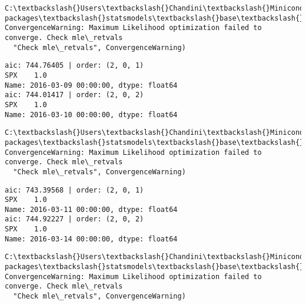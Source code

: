 \documentclass[11pt]{article}
\begin{document}
    \begin{Verbatim}[commandchars=\\\{\}]
C:\textbackslash{}Users\textbackslash{}Chandini\textbackslash{}Miniconda3\textbackslash{}envs\textbackslash{}auquan\textbackslash{}lib\textbackslash{}site-packages\textbackslash{}statsmodels\textbackslash{}base\textbackslash{}model.py:496: ConvergenceWarning: Maximum Likelihood optimization failed to converge. Check mle\_retvals
  "Check mle\_retvals", ConvergenceWarning)

    \end{Verbatim}

    \begin{Verbatim}[commandchars=\\\{\}]
aic: 744.76405 | order: (2, 0, 1)
SPX    1.0
Name: 2016-03-09 00:00:00, dtype: float64
aic: 744.01417 | order: (2, 0, 2)
SPX    1.0
Name: 2016-03-10 00:00:00, dtype: float64

    \end{Verbatim}

    \begin{Verbatim}[commandchars=\\\{\}]
C:\textbackslash{}Users\textbackslash{}Chandini\textbackslash{}Miniconda3\textbackslash{}envs\textbackslash{}auquan\textbackslash{}lib\textbackslash{}site-packages\textbackslash{}statsmodels\textbackslash{}base\textbackslash{}model.py:496: ConvergenceWarning: Maximum Likelihood optimization failed to converge. Check mle\_retvals
  "Check mle\_retvals", ConvergenceWarning)

    \end{Verbatim}

    \begin{Verbatim}[commandchars=\\\{\}]
aic: 743.39568 | order: (2, 0, 1)
SPX    1.0
Name: 2016-03-11 00:00:00, dtype: float64
aic: 744.92227 | order: (2, 0, 2)
SPX    1.0
Name: 2016-03-14 00:00:00, dtype: float64

    \end{Verbatim}

    \begin{Verbatim}[commandchars=\\\{\}]
C:\textbackslash{}Users\textbackslash{}Chandini\textbackslash{}Miniconda3\textbackslash{}envs\textbackslash{}auquan\textbackslash{}lib\textbackslash{}site-packages\textbackslash{}statsmodels\textbackslash{}base\textbackslash{}model.py:496: ConvergenceWarning: Maximum Likelihood optimization failed to converge. Check mle\_retvals
  "Check mle\_retvals", ConvergenceWarning)

    \end{Verbatim}
\end{document}
